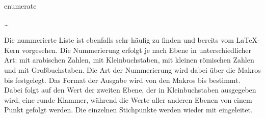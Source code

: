   \begin{Declaration}
    \begin{Environment}{enumerate}
      \begin{Body}
         \dots
        \BodyDots
      \end{Body}
    \end{Environment}
  \end{Declaration}%
  Die nummerierte
  Liste ist ebenfalls sehr häufig zu finden und
  bereits vom {\LaTeX}-Kern vorgesehen. Die Nummerierung
  erfolgt je nach Ebene in unterschiedlicher Art: mit arabischen Zahlen, mit
  Kleinbuchstaben, mit kleinen römischen Zahlen und mit Großbuchstaben. Die
  Art der Nummerierung wird dabei über die Makros  bis
   festgelegt. Das Format der Ausgabe wird von den Makros
   bis  bestimmt. Dabei folgt auf den
  Wert der zweiten Ebene, der in Kleinbuchstaben ausgegeben wird, eine runde
  Klammer, während die Werte aller anderen Ebenen von einem Punkt gefolgt
  werden.  Die einzelnen Stichpunkte werden wieder mit 
  eingeleitet.%
